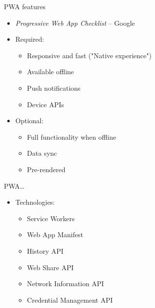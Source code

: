\documentclass[presentation]{beamer}
\begin{document}
\begin{frame}[label={sec:org9593550}]{PWA features}
\begin{itemize}
\item \emph{Progressive Web App Checklist} -- Google
\end{itemize}
\pause
\begin{itemize}
\item Required:
\begin{itemize}
\item Responsive and fast ("Native experience")
\item Available offline
\item Push notifications
\item Device APIs
\end{itemize}
\end{itemize}
\pause
\begin{itemize}
\item Optional:
\begin{itemize}
\item Full functionality when offline
\item Data sync
\item Pre-rendered
\end{itemize}
\end{itemize}
\end{frame}

\begin{frame}[label={sec:org09d30cd}]{PWA\ldots{}}
\begin{itemize}
\item Technologies:
\begin{itemize}
\item Service Workers
\item Web App Manifest
\item History API
\item Web Share API
\item Network Information API
\item Credential Management API
\end{itemize}
\end{itemize}
\end{frame}
\end{document}
